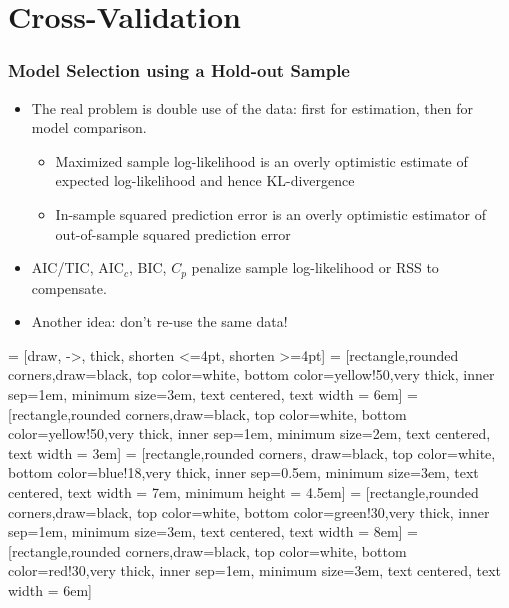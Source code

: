 \section{Cross-Validation}
\begin{frame}
  \frametitle{Model Selection using a Hold-out Sample}

  \begin{itemize}
    \item The real problem is \alert{double} use of the data: first for estimation, then for model comparison. \pause
      \begin{itemize}
        \item Maximized sample log-likelihood is an overly optimistic estimate of expected log-likelihood and hence KL-divergence \pause
        \item In-sample squared prediction error is an overly optimistic estimator of out-of-sample squared prediction error \pause
      \end{itemize}
  \item AIC/TIC, AIC$_c$, BIC, $C_p$ \alert{penalize} sample log-likelihood or RSS to compensate. \pause
  \item Another idea: \alert{don't re-use the same data!}
  \end{itemize}

\end{frame}
 = [draw, ->,  thick, shorten <=4pt, shorten >=4pt]
 = [rectangle,rounded corners,draw=black, top color=white, bottom color=yellow!50,very thick, inner sep=1em, minimum size=3em, text centered, text width = 6em]
 = [rectangle,rounded corners,draw=black, top color=white, bottom color=yellow!50,very thick, inner sep=1em, minimum size=2em, text centered, text width = 3em]
 = [rectangle,rounded corners, draw=black, top color=white, bottom color=blue!18,very thick, inner sep=0.5em, minimum size=3em, text centered, text width = 7em, minimum height = 4.5em]
 = [rectangle,rounded corners,draw=black, top color=white, bottom color=green!30,very thick, inner sep=1em, minimum size=3em, text centered, text width = 8em]
 = [rectangle,rounded corners,draw=black, top color=white, bottom color=red!30,very thick, inner sep=1em, minimum size=3em, text centered, text width = 6em]

